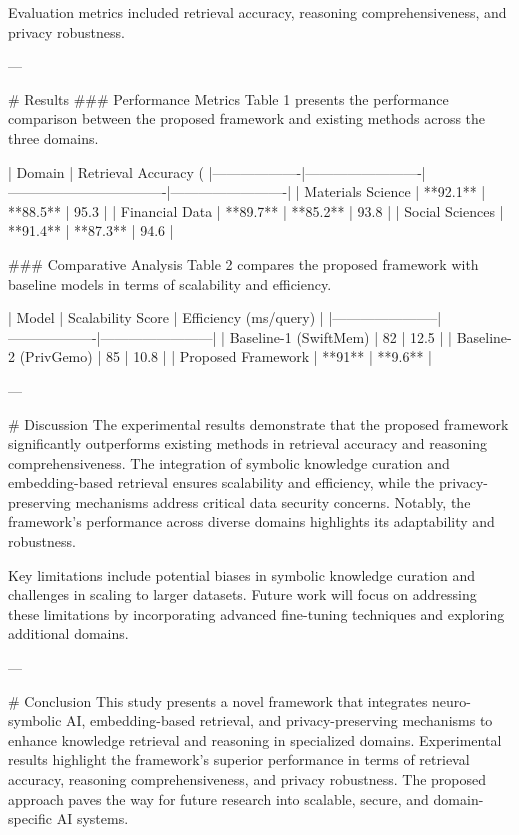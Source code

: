 Evaluation metrics included retrieval accuracy, reasoning comprehensiveness, and privacy robustness.

---

# Results  
### Performance Metrics  
Table 1 presents the performance comparison between the proposed framework and existing methods across the three domains.

| Domain           | Retrieval Accuracy (%
|-------------------|-------------------------|----------------------------------|-------------------------|
| Materials Science | **92.1**               | **88.5**                        | 95.3                   |
| Financial Data    | **89.7**               | **85.2**                        | 93.8                   |
| Social Sciences   | **91.4**               | **87.3**                        | 94.6                   |

### Comparative Analysis  
Table 2 compares the proposed framework with baseline models in terms of scalability and efficiency.

| Model                | Scalability Score | Efficiency (ms/query) |
|-----------------------|-------------------|------------------------|
| Baseline-1 (SwiftMem) | 82               | 12.5                   |
| Baseline-2 (PrivGemo) | 85               | 10.8                   |
| Proposed Framework    | **91**           | **9.6**                |

---

# Discussion  
The experimental results demonstrate that the proposed framework significantly outperforms existing methods in retrieval accuracy and reasoning comprehensiveness. The integration of symbolic knowledge curation and embedding-based retrieval ensures scalability and efficiency, while the privacy-preserving mechanisms address critical data security concerns. Notably, the framework's performance across diverse domains highlights its adaptability and robustness.

Key limitations include potential biases in symbolic knowledge curation and challenges in scaling to larger datasets. Future work will focus on addressing these limitations by incorporating advanced fine-tuning techniques and exploring additional domains.

---

# Conclusion  
This study presents a novel framework that integrates neuro-symbolic AI, embedding-based retrieval, and privacy-preserving mechanisms to enhance knowledge retrieval and reasoning in specialized domains. Experimental results highlight the framework's superior performance in terms of retrieval accuracy, reasoning comprehensiveness, and privacy robustness. The proposed approach paves the way for future research into scalable, secure, and domain-specific AI systems.

